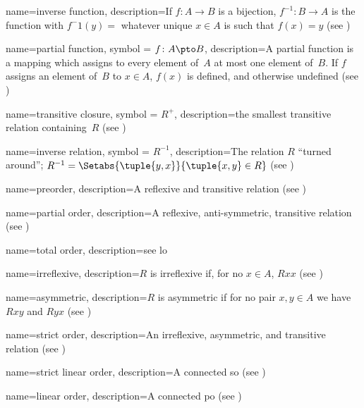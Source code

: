  {
  name=inverse function,
  description={If $f\colon A \to B$ is a \gls{bijection}, $f^{-1} \colon
    B \to A$ is the function with $f^-1(y) =$ whatever unique $x \in
    A$ is such that $f(x) = y$ (see )} }

 {
  name=partial function,
    symbol = {\ensuremath{f \colon A \pto B}},
  description={A partial function is a mapping which assigns to every
    {element} of~$A$ at most one {element} of~$B$. If $f$ assigns
    an element of~$B$ to $x \in A$, $f(x)$ is defined, and otherwise
    undefined (see )} }

 {
  name=transitive closure,
  symbol = {\ensuremath{R^+}},
  description={the smallest \gls{transitive} relation containing~$R$
    (see )} }

 {
  name=inverse relation,
  symbol = {\ensuremath{R^{-1}}},  
  description={The relation $R$ ``turned around''; $R^{-1} =
    \Setabs{\tuple{y, x}}{\tuple{x, y} \in R}$ (see
    )} }

 {
  name=preorder,
  description={A \gls{reflexive} and \gls{transitive} relation (see
    )} }

 {
  name=partial order,
  description={A \gls{reflexive}, \gls{anti-symmetric},
    \gls{transitive} relation (see )} }

 {
  name=total order,
  description={see \gls{lo}}}

 {
  name=irreflexive,
  description={$R$ is irreflexive if, for no $x \in A$, $Rxx$ (see
    )} }

 {
  name=asymmetric,
  description={$R$ is asymmetric if for no pair $x,y\in A$ we have
    $Rxy$ and $Ryx$ (see )} }

 {
  name=strict order,
  description={An \gls{irreflexive}, \gls{asymmetric}, and
    \gls{transitive} relation (see )} }

 {
  name=strict linear order,
  description={A connected \gls{so} (see
    )} }

 {
  name=linear order,
  description={A connected \gls{po} (see
    )} }

